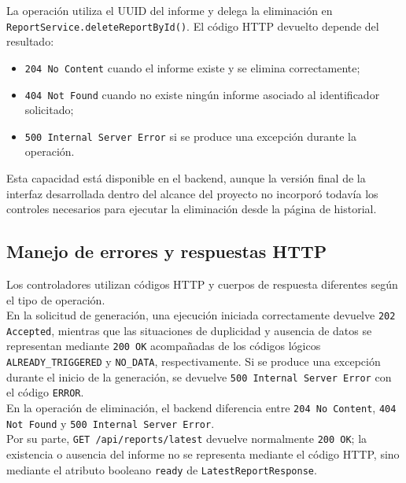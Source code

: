 \documentclass[11pt,a4paper,titlepage,oneside]{report}
\begin{document}
La operación utiliza el UUID del informe y delega la eliminación en
\texttt{ReportService.deleteReportById()}. El código HTTP devuelto depende del
resultado:

\begin{itemize}

  \item \texttt{204 No Content} cuando el informe existe y se elimina
  correctamente;

  \item \texttt{404 Not Found} cuando no existe ningún informe asociado al
  identificador solicitado;

  \item \texttt{500 Internal Server Error} si se produce una excepción
  durante la operación.

\end{itemize}

Esta capacidad está disponible en el backend, aunque la versión final de la
interfaz desarrollada dentro del alcance del proyecto no incorporó todavía
los controles necesarios para ejecutar la eliminación desde la página de
historial.

\subsection{Manejo de errores y respuestas HTTP}

Los controladores utilizan códigos HTTP y cuerpos de respuesta diferentes
según el tipo de operación. \\

En la solicitud de generación, una ejecución iniciada correctamente devuelve
\texttt{202 Accepted}, mientras que las situaciones de duplicidad y ausencia
de datos se representan mediante \texttt{200 OK} acompañadas de los códigos
lógicos \texttt{ALREADY\_TRIGGERED} y \texttt{NO\_DATA},
respectivamente. Si se produce una excepción durante el inicio de la
generación, se devuelve \texttt{500 Internal Server Error} con el código
\texttt{ERROR}. \\

En la operación de eliminación, el backend diferencia entre
\texttt{204 No Content}, \texttt{404 Not Found} y
\texttt{500 Internal Server Error}. \\

Por su parte, \texttt{GET /api/reports/latest} devuelve normalmente
\texttt{200 OK}; la existencia o ausencia del informe no se representa
mediante el código HTTP, sino mediante el atributo booleano
\texttt{ready} de \texttt{LatestReportResponse}. \\
\end{document}
